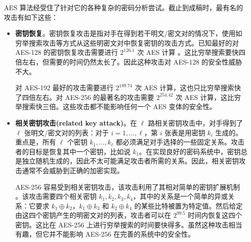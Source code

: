 \begin{snote}[AES的安全性。]
AES 算法经受住了针对它的各种复杂的密码分析尝试。截止到成稿时，最有名的攻击有如下这些：
\begin{itemize}
	\item \textbf{密钥恢复}。密钥恢复攻击是指对手在得到若干明文/密文对的情况下，使用如穷举搜索攻击等方式从这些明密文对中恢复密钥的攻击方式。已知最好的对 AES-128 的密钥恢复攻击需要进行 $2^{126.1}$ 次 AES 计算 \cite{bogdanov2011biclique}。这比穷举搜索要快四倍左右，但需要的时间仍然太长了。因此这种攻击对 AES-128 的安全性威胁不大。
	
	对 AES-192 最好的攻击需要进行 $2^{189.74}$ 次 AES 计算，这也只比穷举搜索快了四倍左右。对 AES-256 的最著名的攻击需要 $2^{254.42}$ 次 AES 计算，这比穷举搜索快三倍。这些攻击都不能影响任何一个 AES 变体的安全性。
	\item \textbf{相关密钥攻击(related key attack)}。在 $\ell$ 路相关密钥攻击中，对手得到了 $\ell$ 张明文/密文对的列表：对于 $i=1,\dots,\ell$，第 $i$ 张表是用密钥 $k_i$ 生成的。重点是，所有 $\ell$ 个密钥 $k_1,\dots,k_\ell$ 都必须满足对手选择的一些固定关系。攻击者的目标是恢复其中一个密钥，比如说 $k_1$。在实现良好的密码系统中，密钥总是独立随机生成的，因此不太可能满足攻击者所需的关系。因此，相关密钥攻击通常不会威胁到正确的加密实现。

    AES-256 容易受到相关密钥攻击，该攻击利用了其相对简单的密钥扩展机制 \cite{biryukov2009related}。该攻击需要四个相关密钥 $k_1,k_2,k_3,k_4$，其中的关系是一个简单的异或关系：它要求 $k_1\oplus k_2$，$k_1\oplus k_3$ 和 $k_2\oplus k_4$ 的某些比特被置为特定值。然后给定由这四个密钥产生的明密文对的列表，攻击者可以在 $2^{99.5}$ 时间内恢复这四个密钥。这比在 AES-256 上进行穷举搜索的时间要快得多。虽然这种攻击相当有趣，但它并不能影响 AES-256 在完善的系统中的安全性。
\end{itemize}
\end{snote}


